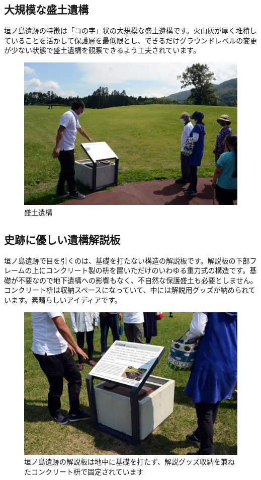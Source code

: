 \documentclass[a4j,11pt,twocolumn,openany]{jsbook}
\begin{document}
\subsection{大規模な盛土遺構}

垣ノ島遺跡の特徴は「コの字」状の大規模な盛土遺構です。火山灰が厚く堆積していることを活かして保護層を最低限とし、できるだけグラウンドレベルの変更が少ない状態で盛土遺構を観察できるよう工夫されています。

\begin{figure}[ht]
	\centering
	\includegraphics[width=\linewidth]{fig/01_Iseki_kengaku/16Kakinosima_morido.JPG}
	\caption{盛土遺構}
	\label{}
\end{figure}

\subsection{史跡に優しい遺構解説板}
垣ノ島遺跡で目を引くのは、基礎を打たない構造の解説板です。解説板の下部フレームの上にコンクリート製の枡を置いただけのいわゆる重力式の構造です。基礎が不要なので地下遺構への影響もなく、不自然な保護盛土も必要としません。コンクリート枡は収納スペースになっていて、中には解説用グッズが納められています。素晴らしいアイディアです。

\begin{figure}[ht]
	\centering
	\includegraphics[width=\linewidth]{fig/01_Iseki_kengaku/17_Kakinosima_sign.JPG}
	\caption{垣ノ島遺跡の解説板は地中に基礎を打たず、解説グッズ収納を兼ねたコンクリート枡で固定されています}
	\label{}
\end{figure}
\end{document}
